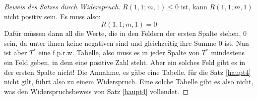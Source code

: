 \begin{proof}[Beweis des Satzes durch Widerspruch]
    $R(1, 1; m, 1)\leq 0$ ist, kann $R(1, 1; m, 1)$ nicht positiv sein. Es muss also:
    \[
    R(1, 1; m, 1)= 0
    \]
    Dafür müssen dann all die Werte, die in den Feldern der ersten Spalte stehen, 0 sein, da unter ihnen keine 
    negativen sind und gleichzeitig ihre Summe 0 ist. Nun ist aber $T^*$ eine f.p.r.w. Tabelle, also muss es in jeder 
    Spalte von $T^*$ mindestens ein Feld geben, in dem eine positive Zahl steht. Aber ein solches Feld gibt es in 
    der ersten Spalte nicht! Die Annahme, es gäbe eine Tabelle, für die Satz \ref{haupt4} nicht gilt, führt also zu 
    einem Widerspruch. Eine solche Tabelle gibt es also nicht, was den Widerspruchsbeweis von Satz \ref{haupt4} vollendet.
    \renewcommand{\qedsymbol}{$\blacksquare$}
\end{proof}